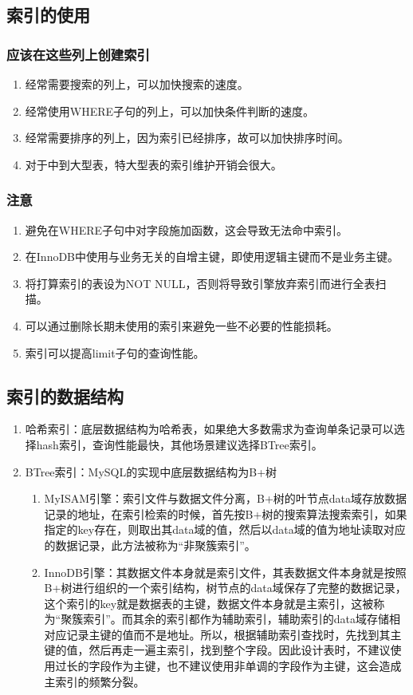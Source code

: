 \subsection{索引的使用}
\subsubsection{应该在这些列上创建索引}
\begin{enumerate}
    \item 经常需要搜索的列上，可以加快搜索的速度。
    \item 经常使用WHERE子句的列上，可以加快条件判断的速度。
    \item 经常需要排序的列上，因为索引已经排序，故可以加快排序时间。
    \item 对于中到大型表，特大型表的索引维护开销会很大。
\end{enumerate}
\subsubsection{注意}
\begin{enumerate}
    \item 避免在WHERE子句中对字段施加函数，这会导致无法命中索引。
    \item 在InnoDB中使用与业务无关的自增主键，即使用逻辑主键而不是业务主键。
    \item 将打算索引的表设为NOT NULL，否则将导致引擎放弃索引而进行全表扫描。
    \item 可以通过删除长期未使用的索引来避免一些不必要的性能损耗。
    \item 索引可以提高limit子句的查询性能。
\end{enumerate}

\subsection{索引的数据结构}
\begin{enumerate}
    \item 哈希索引：底层数据结构为哈希表，如果绝大多数需求为查询单条记录可以选择hash索引，查询性能最快，其他场景建议选择BTree索引。
    \item BTree索引：MySQL的实现中底层数据结构为B+树
        \begin{enumerate}
            \item MyISAM引擎：索引文件与数据文件分离，B+树的叶节点data域存放数据记录的地址，在索引检索的时候，首先按B+树的搜索算法搜索索引，如果指定的key存在，则取出其data域的值，然后以data域的值为地址读取对应的数据记录，此方法被称为“非聚簇索引”。
            \item InnoDB引擎：其数据文件本身就是索引文件，其表数据文件本身就是按照B+树进行组织的一个索引结构，树节点的data域保存了完整的数据记录，这个索引的key就是数据表的主键，数据文件本身就是主索引，这被称为“聚簇索引”。而其余的索引都作为辅助索引，辅助索引的data域存储相对应记录主键的值而不是地址。所以，根据辅助索引查找时，先找到其主键的值，然后再走一遍主索引，找到整个字段。因此设计表时，不建议使用过长的字段作为主键，也不建议使用非单调的字段作为主键，这会造成主索引的频繁分裂。
        \end{enumerate}
\end{enumerate}

